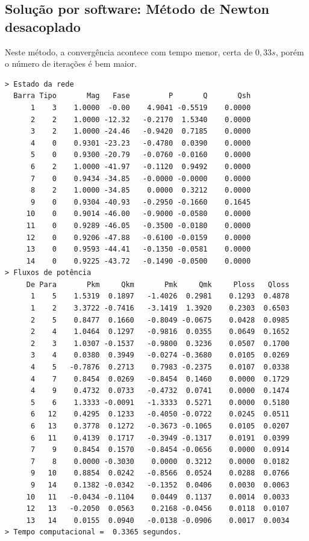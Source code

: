 \subsection{Solução por software: Método de Newton desacoplado}
Neste método, a convergência acontece com tempo menor, certa de $0,33s$, porém o número de iterações é bem maior.
\begin{verbatim}
> Estado da rede
  Barra Tipo       Mag   Fase         P       Q       Qsh
      1    3    1.0000  -0.00    4.9041 -0.5519    0.0000 
      2    2    1.0000 -12.32   -0.2170  1.5340    0.0000 
      3    2    1.0000 -24.46   -0.9420  0.7185    0.0000 
      4    0    0.9301 -23.23   -0.4780  0.0390    0.0000 
      5    0    0.9300 -20.79   -0.0760 -0.0160    0.0000 
      6    2    1.0000 -41.97   -0.1120  0.9492    0.0000 
      7    0    0.9434 -34.85   -0.0000 -0.0000    0.0000 
      8    2    1.0000 -34.85    0.0000  0.3212    0.0000 
      9    0    0.9304 -40.93   -0.2950 -0.1660    0.1645 
     10    0    0.9014 -46.00   -0.9000 -0.0580    0.0000 
     11    0    0.9289 -46.05   -0.3500 -0.0180    0.0000 
     12    0    0.9206 -47.88   -0.6100 -0.0159    0.0000 
     13    0    0.9593 -44.41   -0.1350 -0.0581    0.0000 
     14    0    0.9225 -43.72   -0.1490 -0.0500    0.0000 
> Fluxos de potência
     De Para       Pkm     Qkm       Pmk     Qmk     Ploss   Qloss
      1    5    1.5319  0.1897   -1.4026  0.2981    0.1293  0.4878
      1    2    3.3722 -0.7416   -3.1419  1.3920    0.2303  0.6503
      2    5    0.8477  0.1660   -0.8049 -0.0675    0.0428  0.0985
      2    4    1.0464  0.1297   -0.9816  0.0355    0.0649  0.1652
      2    3    1.0307 -0.1537   -0.9800  0.3236    0.0507  0.1700
      3    4    0.0380  0.3949   -0.0274 -0.3680    0.0105  0.0269
      4    5   -0.7876  0.2713    0.7983 -0.2375    0.0107  0.0338
      4    7    0.8454  0.0269   -0.8454  0.1460    0.0000  0.1729
      4    9    0.4732  0.0733   -0.4732  0.0741    0.0000  0.1474
      5    6    1.3333 -0.0091   -1.3333  0.5271    0.0000  0.5180
      6   12    0.4295  0.1233   -0.4050 -0.0722    0.0245  0.0511
      6   13    0.3778  0.1272   -0.3673 -0.1065    0.0105  0.0207
      6   11    0.4139  0.1717   -0.3949 -0.1317    0.0191  0.0399
      7    9    0.8454  0.1570   -0.8454 -0.0656    0.0000  0.0914
      7    8    0.0000 -0.3030    0.0000  0.3212    0.0000  0.0182
      9   10    0.8854  0.0242   -0.8566  0.0524    0.0288  0.0766
      9   14    0.1382 -0.0342   -0.1352  0.0406    0.0030  0.0063
     10   11   -0.0434 -0.1104    0.0449  0.1137    0.0014  0.0033
     12   13   -0.2050  0.0563    0.2168 -0.0456    0.0118  0.0107
     13   14    0.0155  0.0940   -0.0138 -0.0906    0.0017  0.0034
> Tempo computacional =  0.3365 segundos.
\end{verbatim}

